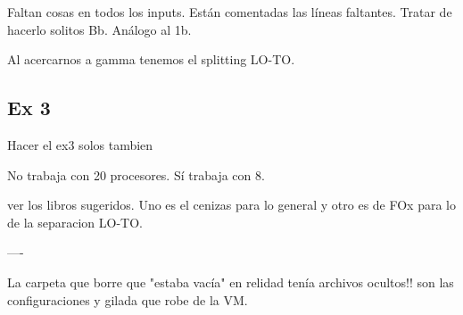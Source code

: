   Faltan cosas en todos los inputs. Están comentadas las líneas faltantes. Tratar de hacerlo solitos Bb. Análogo al 1b.

  Al acercarnos a gamma tenemos el splitting LO-TO.

\subsection{Ex 3}

  Hacer el ex3 solos tambien

  No trabaja con 20 procesores. Sí trabaja con 8.


  ver los libros sugeridos. Uno es el cenizas para lo general y otro es de FOx para lo de la separacion LO-TO.

----

La carpeta que borre que "estaba vacía" en relidad tenía archivos ocultos!! son las configuraciones y gilada que robe de la VM.
